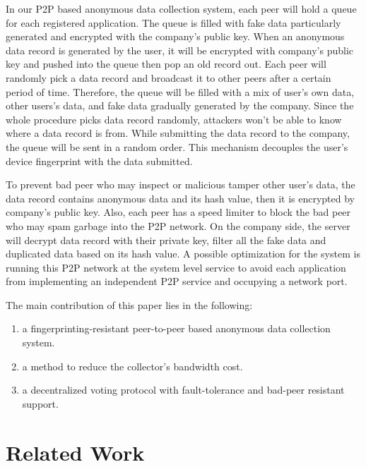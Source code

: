 \documentclass[twocolumn]{article}
\begin{document}
In our P2P based anonymous data collection system, each peer will hold a queue for each registered application. The queue is filled with fake data particularly generated and encrypted with the company’s public key. When an anonymous data record is generated by the user, it will be encrypted with company’s public key and pushed into the queue then pop an old record out. Each peer will randomly pick a data record and broadcast it to other peers after a certain period of time. Therefore, the queue will be filled with a mix of user’s own data, other users’s data, and fake data gradually generated by the company. Since the whole procedure picks data record randomly, attackers won't be able to know where a data record is from. While submitting the data record to the company, the queue will be sent in a random order. This mechanism decouples the user’s device fingerprint with the data submitted.

To prevent bad peer who may inspect or malicious tamper other user’s data, the data record contains anonymous data and its hash value, then it is encrypted by company’s public key. Also, each peer has a speed limiter to block the bad peer who may spam garbage into the P2P network. On the company side, the server will decrypt data record with their private key, filter all the fake data and duplicated data based on its hash value. A possible optimization for the system is running this P2P network at the system level service to avoid each application from implementing an independent P2P service and occupying a network port.

The main contribution of this paper lies in the following:
\begin{enumerate}[label=(\roman*)]
    \item a fingerprinting-resistant peer-to-peer based anonymous data collection system.
    \item a method to reduce the collector's bandwidth cost.
    \item a decentralized voting protocol with fault-tolerance and bad-peer resistant support.
\end{enumerate}

\section{Related Work}
\end{document}
